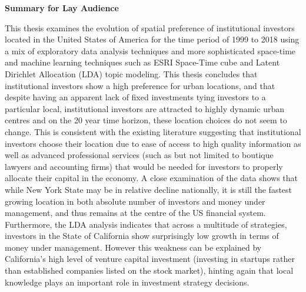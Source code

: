 \documentclass[12pt,letterpaper]{book}
\numberwithin{figure}{chapter}
\newenvironment{preliminary}%
{\pagestyle{plain}\pagenumbering{roman}}%
{\pagenumbering{arabic}}
\begin{document}
\begin{preliminary}
		\Large\begin{center}\textbf{Summary for Lay Audience}\end{center}\normalsize
		\begin{spacing}{2}
			This thesis examines the evolution of spatial preference of institutional investors located in the United States of America for the time period of 1999 to 2018 using a mix of exploratory data analysis techniques and more sophisticated space-time and machine learning techniques such as ESRI Space-Time cube and Latent Dirichlet Allocation (LDA) topic modeling.  This thesis concludes that institutional investors show a high preference for urban locations, and that despite having an apparent lack of fixed investments tying investors to a particular local, institutional investors are attracted to highly dynamic urban centres and on the 20 year time horizon, these location choices do not seem to change.  This is consistent with the existing literature suggesting that institutional investors choose their location due to ease of access to high quality information as well as advanced professional services (such as but not limited to boutique lawyers and accounting firms) that would be needed for investors to properly allocate their capital in the economy.  A close examination of the data shows that while New York State may be in relative decline nationally, it is still the fastest growing location in both absolute number of investors and money under management, and thus remains at the centre of the US financial system. Furthermore, the LDA analysis indicates that across a multitude of strategies, investors in the State of California show surprisingly low growth in terms of money under management.  However this weakness can be explained by California's high level of venture capital investment (investing in startups rather than established companies listed on the stock market), hinting again that local knowledge plays an important role in investment strategy decisions. 
			

\end{spacing}
\end{preliminary}
\end{document}
